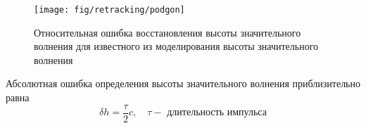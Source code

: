 \documentclass[10pt,pdf,hyperref={unicode}, dvipsnames]{beamer}
\begin{document}
\begin{frame}[t]{}
    \begin{figure}[h]
        \centering
        \texttt{[image: fig/retracking/podgon]}
        \caption{Относительная ошибка восстановления высоты значительного
        волнения для известного из моделирования высоты значительного волнения}
    \end{figure}
    Абсолютная ошибка определения высоты значительного волнения приблизительно
    равна
    \begin{equation}
        \delta h = \frac{\tau}{2} c, \quad \tau - \text{ длительность импульса}
    \end{equation}
\end{frame}

\end{document}
